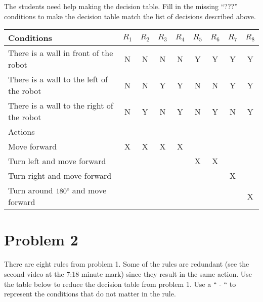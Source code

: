 \documentclass{article}
\begin{document}
    The students need help making the decision table. Fill in the missing “???” conditions to
    make the decision table match the list of decisions described above.

    \begin{center}
        \begin{tabular} {|l|c|c|c|c|c|c|c|c|}
            \hline
            Conditions & $R_1$ & $R_2$ & $R_3$ & $R_4$ & $R_5$ & $R_6$ & $R_7$ & $R_8$ \\
            \hline
            There is a wall in front of the robot & N & N & N & N & Y & Y & Y & Y \\
            There is a wall to the left of the robot & N & N & Y & Y & N & N & Y & Y \\
            There is a wall to the right of the robot & N & Y & N & Y & N & Y & N & Y \\
            \hline
            Actions & & & & & & & & \\
            \hline
            Move forward & X & X & X & X & & & & \\
            Turn left and move forward & & & & & X & X & & \\
            Turn right and move forward & & & & & & & X & \\
            Turn around $180\degree$ and move forward & & & & & & & & X \\
            \hline
        \end{tabular}
    \end{center}

    \section*{Problem 2}

    There are eight rules from problem 1. Some of the rules are redundant (see the second
    video at the 7:18 minute mark) since they result in the same action. Use the table below
    to reduce the decision table from problem 1. Use a “ - “ to represent the conditions that
    do not matter in the rule.
    
\end{document}
